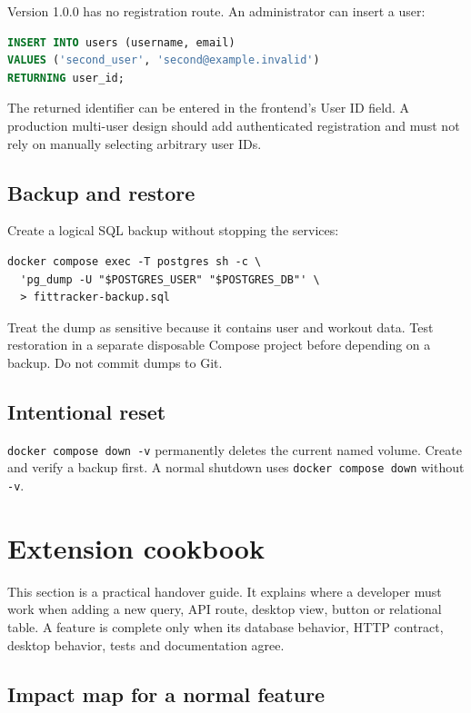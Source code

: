 \documentclass[11pt,a4paper]{article}
\begin{document}
Version 1.0.0 has no registration route. An administrator can insert a user:

\begin{lstlisting}[language=SQL]
INSERT INTO users (username, email)
VALUES ('second_user', 'second@example.invalid')
RETURNING user_id;
\end{lstlisting}

The returned identifier can be entered in the frontend's User ID field. A
production multi-user design should add authenticated registration and must
not rely on manually selecting arbitrary user IDs.

\subsection{Backup and restore}

Create a logical SQL backup without stopping the services:

\begin{lstlisting}
docker compose exec -T postgres sh -c \
  'pg_dump -U "$POSTGRES_USER" "$POSTGRES_DB"' \
  > fittracker-backup.sql
\end{lstlisting}

Treat the dump as sensitive because it contains user and workout data. Test
restoration in a separate disposable Compose project before depending on a
backup. Do not commit dumps to Git.

\subsection{Intentional reset}

\begin{warnbox}
\texttt{docker compose down -v} permanently deletes the current named volume.
Create and verify a backup first. A normal shutdown uses
\texttt{docker compose down} without \texttt{-v}.
\end{warnbox}

\newpage
\section{Extension cookbook}

This section is a practical handover guide. It explains where a developer must
work when adding a new query, API route, desktop view, button or relational
table. A feature is complete only when its database behavior, HTTP contract,
desktop behavior, tests and documentation agree.

\subsection{Impact map for a normal feature}
\end{document}
